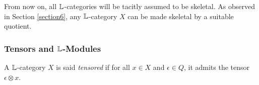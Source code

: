 %
%
%
%
%
% 
%
% 
%
%
%

From now on, all $\mathbb{L}$-categories will be tacitly assumed to be skeletal. As observed in Section \ref{section6}, any $\mathbb{L}$-category $X$ can be made skeletal by a suitable quotient.


\subsubsection{Tensors and $\mathbb{L}$-Modules}

\begin{definition}
A $\mathbb{L}$-category $X$ is said \emph{tensored} if for all $x\in X$ and $\epsilon \in Q$, it admits the tensor $\epsilon \otimes x$.
\end{definition}


